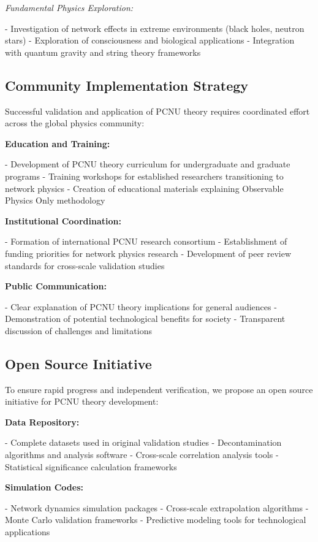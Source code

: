 \documentclass[11pt,a4paper]{article}
\begin{document}
\textit{Fundamental Physics Exploration:}

- Investigation of network effects in extreme environments (black holes, neutron stars)
- Exploration of consciousness and biological applications
- Integration with quantum gravity and string theory frameworks

\subsection{Community Implementation Strategy}

Successful validation and application of PCNU theory requires coordinated effort across the global physics community:

\textbf{Education and Training:}

- Development of PCNU theory curriculum for undergraduate and graduate programs
- Training workshops for established researchers transitioning to network physics
- Creation of educational materials explaining Observable Physics Only methodology

\textbf{Institutional Coordination:}

- Formation of international PCNU research consortium
- Establishment of funding priorities for network physics research
- Development of peer review standards for cross-scale validation studies

\textbf{Public Communication:}

- Clear explanation of PCNU theory implications for general audiences
- Demonstration of potential technological benefits for society
- Transparent discussion of challenges and limitations

\subsection{Open Source Initiative}

To ensure rapid progress and independent verification, we propose an open source initiative for PCNU theory development:

\textbf{Data Repository:}

- Complete datasets used in original validation studies
- Decontamination algorithms and analysis software
- Cross-scale correlation analysis tools
- Statistical significance calculation frameworks

\textbf{Simulation Codes:}

- Network dynamics simulation packages
- Cross-scale extrapolation algorithms
- Monte Carlo validation frameworks
- Predictive modeling tools for technological applications
\end{document}
